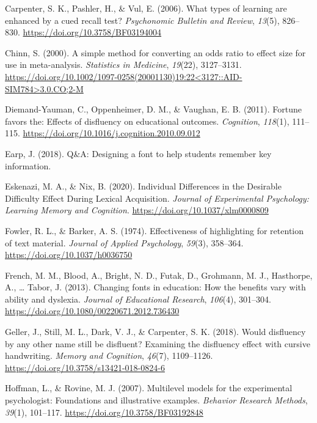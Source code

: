 \documentclass[english,pdf]{apa6}
\begin{document}
\leavevmode\hypertarget{ref-Carpenter2006}{}%
Carpenter, S. K., Pashler, H., \& Vul, E. (2006). What types of learning are enhanced by a cued recall test? \emph{Psychonomic Bulletin and Review}, \emph{13}(5), 826--830. \url{https://doi.org/10.3758/BF03194004}

\leavevmode\hypertarget{ref-Chinn2000}{}%
Chinn, S. (2000). A simple method for converting an odds ratio to effect size for use in meta-analysis. \emph{Statistics in Medicine}, \emph{19}(22), 3127--3131. \href{https://doi.org/10.1002/1097-0258(20001130)19:22\%3C3127::AID-SIM784\%3E3.0.CO;2-M}{https://doi.org/10.1002/1097-0258(20001130)19:22\textless{}3127::AID-SIM784\textgreater{}3.0.CO;2-M}

\leavevmode\hypertarget{ref-Diemand-Yauman2011}{}%
Diemand-Yauman, C., Oppenheimer, D. M., \& Vaughan, E. B. (2011). Fortune favors the: Effects of disfluency on educational outcomes. \emph{Cognition}, \emph{118}(1), 111--115. \url{https://doi.org/10.1016/j.cognition.2010.09.012}

\leavevmode\hypertarget{ref-Earp2018}{}%
Earp, J. (2018). Q\&A: Designing a font to help students remember key information.

\leavevmode\hypertarget{ref-Eskenazi2020}{}%
Eskenazi, M. A., \& Nix, B. (2020). Individual Differences in the Desirable Difficulty Effect During Lexical Acquisition. \emph{Journal of Experimental Psychology: Learning Memory and Cognition}. \url{https://doi.org/10.1037/xlm0000809}

\leavevmode\hypertarget{ref-Fowler1974}{}%
Fowler, R. L., \& Barker, A. S. (1974). Effectiveness of highlighting for retention of text material. \emph{Journal of Applied Psychology}, \emph{59}(3), 358--364. \url{https://doi.org/10.1037/h0036750}

\leavevmode\hypertarget{ref-French2013}{}%
French, M. M., Blood, A., Bright, N. D., Futak, D., Grohmann, M. J., Hasthorpe, A., \ldots{} Tabor, J. (2013). Changing fonts in education: How the benefits vary with ability and dyslexia. \emph{Journal of Educational Research}, \emph{106}(4), 301--304. \url{https://doi.org/10.1080/00220671.2012.736430}

\leavevmode\hypertarget{ref-Geller2018}{}%
Geller, J., Still, M. L., Dark, V. J., \& Carpenter, S. K. (2018). Would disfluency by any other name still be disfluent? Examining the disfluency effect with cursive handwriting. \emph{Memory and Cognition}, \emph{46}(7), 1109--1126. \url{https://doi.org/10.3758/s13421-018-0824-6}

\leavevmode\hypertarget{ref-Hoffman2007}{}%
Hoffman, L., \& Rovine, M. J. (2007). Multilevel models for the experimental psychologist: Foundations and illustrative examples. \emph{Behavior Research Methods}, \emph{39}(1), 101--117. \url{https://doi.org/10.3758/BF03192848}
\end{document}

